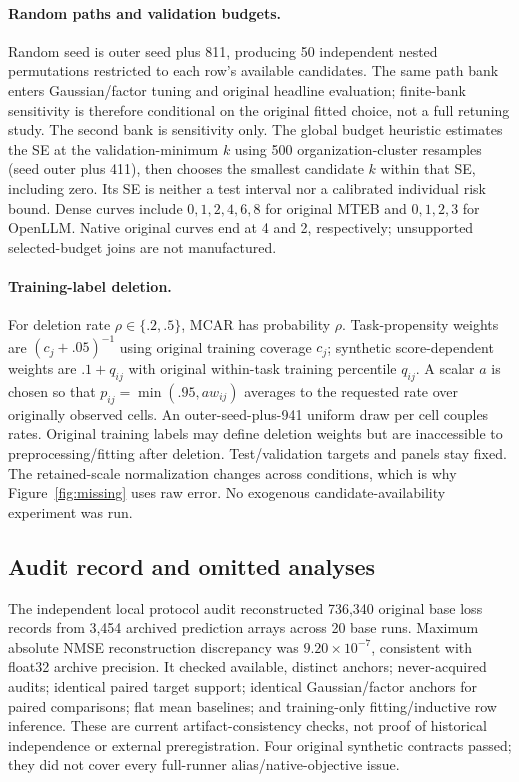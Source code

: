 \documentclass{article}
\begin{document}
\paragraph{Random paths and validation budgets.}
Random seed is outer seed plus 811, producing 50 independent nested permutations restricted to each row's available candidates. The same path bank enters Gaussian/factor tuning and original headline evaluation; finite-bank sensitivity is therefore conditional on the original fitted choice, not a full retuning study. The second bank is sensitivity only. The global budget heuristic estimates the SE at the validation-minimum $k$ using 500 organization-cluster resamples (seed outer plus 411), then chooses the smallest candidate $k$ within that SE, including zero. Its SE is neither a test interval nor a calibrated individual risk bound. Dense curves include $0,1,2,4,6,8$ for original MTEB and $0,1,2,3$ for OpenLLM. Native original curves end at 4 and 2, respectively; unsupported selected-budget joins are not manufactured.

\paragraph{Training-label deletion.}
For deletion rate $\rho\in\{.2,.5\}$, MCAR has probability $\rho$. Task-propensity weights are $(c_j+.05)^{-1}$ using original training coverage $c_j$; synthetic score-dependent weights are $.1+q_{ij}$ with original within-task training percentile $q_{ij}$. A scalar $a$ is chosen so that $p_{ij}=\min(.95,aw_{ij})$ averages to the requested rate over originally observed cells. An outer-seed-plus-941 uniform draw per cell couples rates. Original training labels may define deletion weights but are inaccessible to preprocessing/fitting after deletion. Test/validation targets and panels stay fixed. The retained-scale normalization changes across conditions, which is why Figure~\ref{fig:missing} uses raw error. No exogenous candidate-availability experiment was run.

\subsection{Audit record and omitted analyses}\label{app:audit}
The independent local protocol audit reconstructed 736,340 original base loss records from 3,454 archived prediction arrays across 20 base runs. Maximum absolute NMSE reconstruction discrepancy was $9.20\times10^{-7}$, consistent with float32 archive precision. It checked available, distinct anchors; never-acquired audits; identical paired target support; identical Gaussian/factor anchors for paired comparisons; flat mean baselines; and training-only fitting/inductive row inference. These are current artifact-consistency checks, not proof of historical independence or external preregistration. Four original synthetic contracts passed; they did not cover every full-runner alias/native-objective issue.
\end{document}
